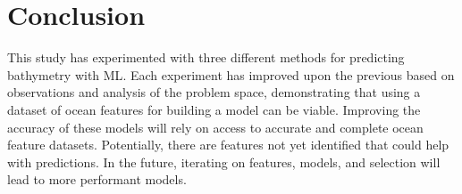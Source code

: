 \section{Conclusion}
\setlength{\parindent}{10ex}
This study has experimented with three different methods for predicting bathymetry with \ac{ML}.
Each experiment has improved upon the previous based on observations and analysis of the problem space, demonstrating that using a dataset of ocean features for building a model can be viable.
Improving the accuracy of these models will rely on access to accurate and complete ocean feature datasets.
Potentially, there are features not yet identified that could help with predictions.
In the future, iterating on features, models, and selection will lead to more performant models.
